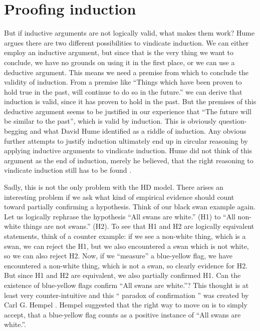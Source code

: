 \section{Proofing induction}

But if inductive arguments are not logically valid, what makes them work?
Hume argues there are two different possibilities to vindicate induction.
We can either employ an inductive argument, but since that is
the very thing we want to conclude, we have no grounds on
using it in the first place, or we can use a deductive argument.
This means we need a premise from which to conclude the
validity of induction.
From a premise like \enquote{Things which have been proven to hold true in
    the past, will continue to do so in the future.} we can derive
that induction is valid, since it has proven to hold in the past.
But the premises of this deductive argument
seems to be justified in our experience that
\enquote{The future will be similar to the past}, which is
valid by induction.
This is obviously question-begging and what
David Hume identified as a riddle of induction.
Any obvious further attempts to justify induction
ultimately end up in circular reasoning by applying inductive arguments to
vindicate induction.
Hume did not think of this argument as the end of induction, merely
he believed, that the right reasoning to vindicate induction
still has to be found \cite[173]{philsciencebook}.

Sadly, this is not the only problem with the HD model.
There arises an interesting problem if we ask what kind of empirical evidence
should count toward partially confirming a hypothesis.
Think of our black swan example again. Let us logically rephrase
the hypothesis \enquote{All swans are white.} (H1)
to \enquote{All non-white things are not swans.} (H2).
To see that H1 and H2 are logically equivalent statements, think of a counter example:
if we see a non-white thing, which is a swan, we can reject the H1, but
we also encountered a swan which is not white, so we can also reject H2.
Now, if we \enquote{measure} a blue-yellow flag, we have encountered a
non-white thing, which is not a swan, so clearly evidence for H2.
But since H1 and H2 are equivalent, we also partially confirmed H1.
Can the existence of blue-yellow flags confirm \enquote{All swans are white.}?
This thought is at least very counter-intuitive and this \enquote{
    paradox of confirmation
} was created by Carl G. Hempel \cite[193]{philsciencebook}.
Hempel suggested that the right way to move on is to simply
accept, that a blue-yellow flag counts as a positive instance of
\enquote{All swans are white.}.

